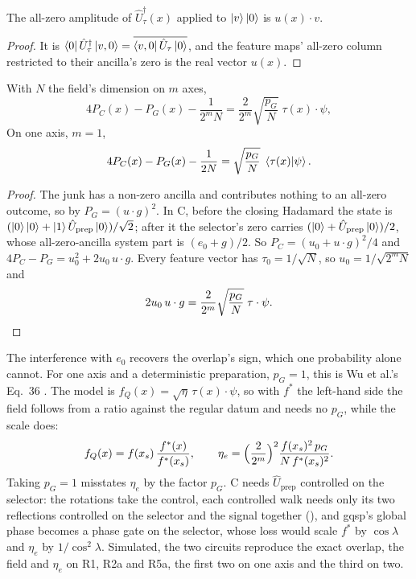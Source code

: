 \begin{lemma}
\label{lem:readout-amplitude}
The all-zero amplitude of $\hat U_\tau^\dagger(x)$ applied to $\ket v\ket0$ is $u(x)\cdot v$.
\end{lemma}
\begin{proof}
It is $\bra0\hat U_\tau^\dagger\ket{v,0}=\overline{\bra{v,0}\hat U_\tau\ket0}$, and the feature maps' all-zero column restricted to their ancilla's zero is the real vector $u(x)$.
\end{proof}

\begin{proposition}
\label{prop:readout-identity}
With $N$ the field's dimension on $m$ axes,
\begin{equation*}
    4P_C(x)-P_G(x)-\frac{1}{2^mN}=\frac{2}{2^m}\sqrt{\frac{p_G}{N}}\;\tau(x)\cdot\psi ,
\end{equation*}
On one axis, $m=1$,
\begin{equation}
    4P_C(x)-P_G(x)-\frac{1}{2N}=\sqrt{\frac{p_G}{N}}\;\braket{\tau(x)|\psi}.
    \label{eq:readout-identity}
\end{equation}
\end{proposition}
\begin{proof}
The junk has a non-zero ancilla and contributes nothing to an all-zero outcome, so by  $P_G=(u\cdot g)^2$. In C, before the closing Hadamard the state is $(\ket0\ket0+\ket1\hat U_{\mathrm{prep}}\ket0)/\sqrt2$; after it the selector's zero carries $(\ket0+\hat U_{\mathrm{prep}}\ket0)/2$, whose all-zero-ancilla system part is $(e_0+g)/2$. So $P_C=(u_0+u\cdot g)^2/4$ and $4P_C-P_G=u_0^2+2u_0\,u\cdot g$. Every feature vector has $\tau_0=1/\sqrt N$, so $u_0=1/\sqrt{2^mN}$ and
\begin{equation*}
    2u_0\,u\cdot g=\frac{2}{2^m}\sqrt{\frac{p_G}{N}}\;\tau\cdot\psi .\qedhere
\end{equation*}
\end{proof}

The interference with $e_0$ recovers the overlap's sign, which one probability alone cannot. For one axis and a deterministic preparation, $p_G=1$, this is Wu et al.'s Eq.~36 \cite{wu2025pihm}. The model is $f_Q(x)=\sqrt\eta\,\tau(x)\cdot\psi$, so with $f^\ast$ the left-hand side the field follows from a ratio against the regular datum and needs no $p_G$, while the scale does:
\begin{equation*}
    f_Q(x)=f(x_s)\,\frac{f^\ast(x)}{f^\ast(x_s)},
    \qquad
    \eta_e=\Bigl(\frac{2}{2^m}\Bigr)^2\frac{f(x_s)^2\,p_G}{N\,f^\ast(x_s)^2}.
\end{equation*}
Taking $p_G=1$ misstates $\eta_e$ by the factor $p_G$. C needs $\hat U_{\mathrm{prep}}$ controlled on the selector: the rotations take the control, each controlled walk needs only its two reflections controlled on the selector and the signal together (), and \gls{gqsp}'s global phase becomes a phase gate on the selector, whose loss would scale $f^\ast$ by $\cos\lambda$ and $\eta_e$ by $1/\cos^2\lambda$. Simulated, the two circuits reproduce the exact overlap, the field and $\eta_e$ on R1, R2a and R5a, the first two on one axis and the third on two.
